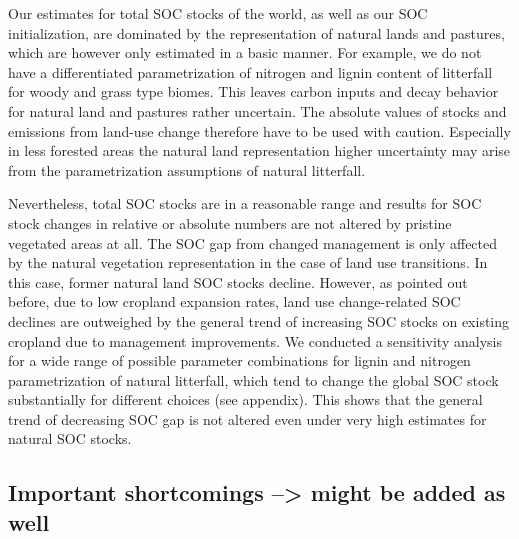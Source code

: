 \documentclass[gc, manuscript]{copernicus}
\begin{document}
Our estimates for total SOC stocks of the world, as well as our SOC initialization, are dominated by the representation of natural lands and pastures, which are however only estimated in a basic manner. For example, we do not have a differentiated parametrization of nitrogen and lignin content of litterfall for woody and grass type biomes. This leaves carbon inputs and decay behavior for natural land and pastures rather uncertain. The absolute values of stocks and emissions from land-use change therefore have to be used with caution. Especially in less forested areas the natural land representation higher uncertainty may arise from the parametrization assumptions of natural litterfall.

Nevertheless, total SOC stocks are in a reasonable range and results for SOC stock changes in relative or absolute numbers are not altered by pristine vegetated areas at all. The SOC gap from changed management is only affected by the natural vegetation representation in the case of land use transitions. In this case, former natural land SOC stocks decline. However, as pointed out before, due to low cropland expansion rates, land use change-related SOC declines are outweighed by the general trend of increasing SOC stocks on existing cropland due to management improvements.
We conducted a sensitivity analysis for a wide range of possible parameter combinations for lignin and nitrogen parametrization of natural litterfall, which tend to change the global SOC stock substantially for different choices
(see appendix). This shows that the general trend of decreasing SOC gap is not altered even under very high estimates for natural SOC stocks.

\hypertarget{important-shortcomings-might-be-added-as-well}{%
\subsection{Important shortcomings --\textgreater{} might be added as well}\label{important-shortcomings-might-be-added-as-well}}
\end{document}

